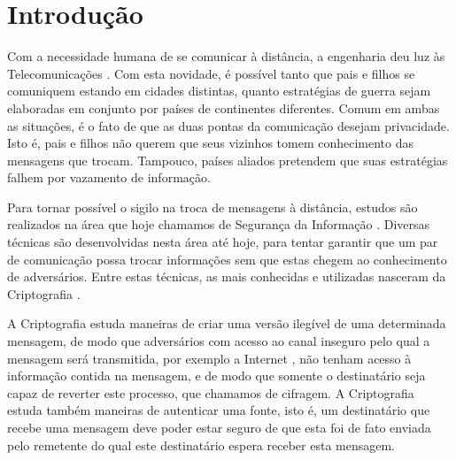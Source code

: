 
\chapter{Introdução}

Com a necessidade humana de se comunicar à distância, a engenharia deu luz às Telecomunicações \cite{telecommunications}. Com esta novidade, é possível tanto que pais e filhos se comuniquem estando em cidades distintas, quanto estratégias de guerra sejam elaboradas em conjunto por países de continentes diferentes. Comum em ambas as situações, é o fato de que as duas pontas da comunicação desejam privacidade. Isto é, pais e filhos não querem que seus vizinhos tomem conhecimento das mensagens que trocam. Tampouco, países aliados pretendem que suas estratégias falhem por vazamento de informação.

Para tornar possível o sigilo na troca de mensagens à distância, estudos são realizados na área que hoje chamamos de Segurança da Informação \cite{information_security}. Diversas técnicas são desenvolvidas nesta área até hoje, para tentar garantir que um par de comunicação possa trocar informações sem que estas chegem ao conhecimento de adversários. Entre estas técnicas, as mais conhecidas e utilizadas nasceram da Criptografia \cite{cryptography}.

A Criptografia estuda maneiras de criar uma versão ilegível de uma determinada mensagem, de modo que adversários com acesso ao canal inseguro pelo qual a mensagem será transmitida, por exemplo a Internet \cite{internet}, não tenham acesso à informação contida na mensagem, e de modo que somente o destinatário seja capaz de reverter este processo, que chamamos de cifragem. A Criptografia estuda também maneiras de autenticar uma fonte, isto é, um destinatário que recebe uma mensagem deve poder estar seguro de que esta foi de fato enviada pelo remetente do qual este destinatário espera receber esta mensagem.

